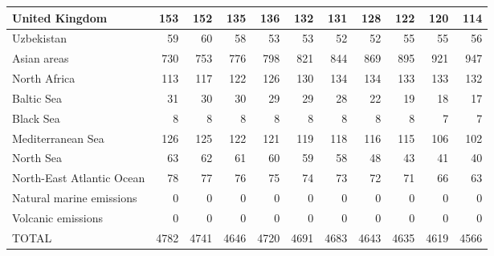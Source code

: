 \begin{table}
\begin{tabular}{|l|r|r|r|r|r|r|r|r|r|r|}
                United Kingdom&    153&    152&    135&    136&    132&    131&    128&    122&    120&    114\\\hline
                    Uzbekistan&     59&     60&     58&     53&     53&     52&     52&     55&     55&     56\\\hline
                   Asian areas&    730&    753&    776&    798&    821&    844&    869&    895&    921&    947\\\hline
                  North Africa&    113&    117&    122&    126&    130&    134&    134&    133&    133&    132\\\hline
                    Baltic Sea&     31&     30&     30&     29&     29&     28&     22&     19&     18&     17\\\hline
                     Black Sea&      8&      8&      8&      8&      8&      8&      8&      8&      7&      7\\\hline
             Mediterranean Sea&    126&    125&    122&    121&    119&    118&    116&    115&    106&    102\\\hline
                     North Sea&     63&     62&     61&     60&     59&     58&     48&     43&     41&     40\\\hline
     North-East Atlantic Ocean&     78&     77&     76&     75&     74&     73&     72&     71&     66&     63\\\hline
      Natural marine emissions&      0&      0&      0&      0&      0&      0&      0&      0&      0&      0\\\hline
            Volcanic emissions&      0&      0&      0&      0&      0&      0&      0&      0&      0&      0\\\hline\hline
                         TOTAL&   4782&   4741&   4646&   4720&   4691&   4683&   4643&   4635&   4619&   4566\\\hline
 \end{tabular}
 \end{table}
 
